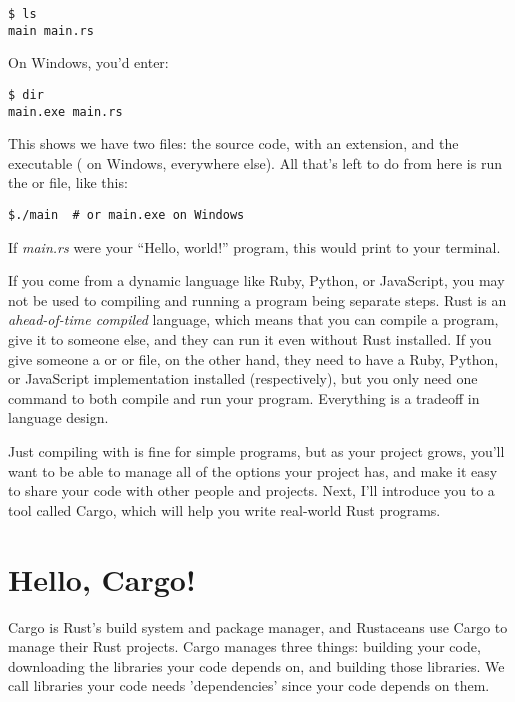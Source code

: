 \begin{verbatim}
$ ls
main main.rs 
\end{verbatim}

On Windows, you'd enter:

\begin{verbatim}
$ dir
main.exe main.rs  
\end{verbatim}

This shows we have two files: the source code, with an  extension, and the executable ( on Windows, 
 everywhere else). All that's left to do from here is run the  or  file, like this:

\begin{verbatim}
$./main  # or main.exe on Windows  
\end{verbatim}

If \emph{main.rs} were your \enquote{Hello, world!} program, this would print  to your terminal.

\blank

If you come from a dynamic language like Ruby, Python, or JavaScript, you may not be used to compiling and running a program 
being separate steps. Rust is an \emph{ahead-of-time compiled} language, which means that you can compile a program, give it 
to someone else, and they can run it even without Rust installed. If you give someone a  or  or  
file, on the other hand, they need to have a Ruby, Python, or JavaScript implementation installed (respectively), but you only 
need one command to both compile and run your program. Everything is a tradeoff in language design.

\blank

Just compiling with  is fine for simple programs, but as your project grows, you'll want to be able to manage all 
of the options your project has, and make it easy to share your code with other people and projects. Next, I'll introduce you 
to a tool called Cargo, which will help you write real-world Rust programs.

\section{Hello, Cargo!}
\label{sec:gettingstarted_helloCargo}

Cargo is Rust's build system and package manager, and Rustaceans use Cargo to manage their Rust projects. Cargo manages 
three things: building your code, downloading the libraries your code depends on, and building those libraries. We call 
libraries your code needs 'dependencies' since your code depends on them.

